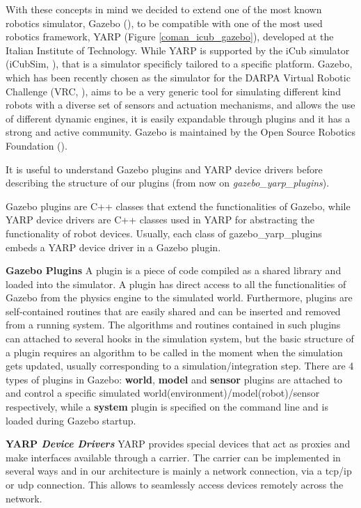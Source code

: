 With these concepts in mind we decided to extend one of the most known robotics simulator, Gazebo (\cite{koenig2004design}), to be compatible with one of the most used robotics framework, YARP (Figure \ref{coman_icub_gazebo}), developed at the Italian Institute of Technology. 
While YARP is supported by the iCub simulator (iCubSim, \cite{Tikhanoff:2008:OSC:1774674.1774684}), that is a simulator specificly tailored to a specific platform. 
Gazebo, which has been recently chosen as the simulator for the DARPA Virtual Robotic Challenge (VRC, \cite{DRC}), aims to be a very generic tool for simulating different kind robots with a diverse set of sensors and actuation mechanisms, and allows the use of different dynamic engines, it is easily expandable through plugins and it has a strong and active community. Gazebo is maintained by the Open Source Robotics Foundation (\cite{OSRF}).

\label{structure}
It is useful to understand Gazebo plugins and YARP device drivers before describing the structure of our plugins (from now on \emph{gazebo\_yarp\_plugins}).

Gazebo plugins are C++ classes that extend the functionalities of Gazebo, while YARP device drivers are C++ classes used in YARP for abstracting the functionality of robot devices.
Usually, each class of gazebo\_yarp\_plugins embeds a YARP device driver in a Gazebo plugin. 

{\bf Gazebo Plugins}
A plugin is a piece of code compiled as a shared library and loaded into the simulator. A plugin has direct access to all the functionalities of Gazebo from the physics engine to the simulated world. Furthermore, plugins are self-contained routines that are easily shared and can be inserted and removed from a running system. The algorithms and routines contained in such plugins can attached to several hooks in the simulation system, but the basic structure of a plugin requires an algorithm to be called in the moment when the simulation gets updated, usually corresponding to a simulation/integration step. There are 4 types of plugins in Gazebo: \textbf{world}, \textbf{model} and \textbf{sensor} plugins are attached to and control a specific simulated world(environment)/model(robot)/sensor respectively, while a \textbf{system} plugin is specified on the command line and is loaded during Gazebo startup.


{\bf YARP \emph{Device Drivers}}
YARP provides special devices that act as proxies and make interfaces available through a carrier. The carrier can be implemented in several ways and in our architecture is mainly a network connection, via a tcp/ip or udp connection. This allows to seamlessly access devices remotely across the network.

